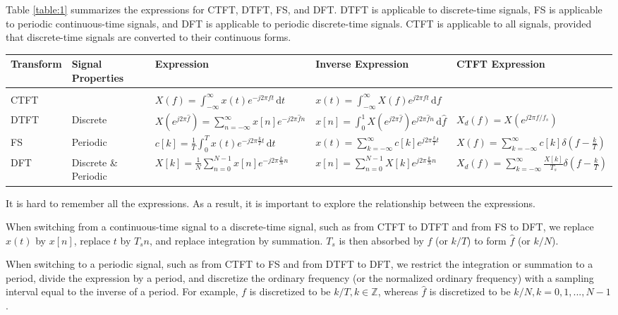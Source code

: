 \documentclass[journal,twoside]{IEEEtran}
\newcommand{\dd}{\,\mathrm{d}}
\begin{document}
Table \ref{table:1} summarizes the expressions for CTFT, DTFT, FS, and DFT. DTFT is applicable to discrete-time signals, FS is applicable to periodic continuous-time signals, and DFT is applicable to periodic discrete-time signals. CTFT is applicable to all signals, provided that discrete-time signals are converted to their continuous forms.

\begin{table*}[htb!]
\caption{Summary of CTFT, DTFT, FS, and DFT}
\centering
{\renewcommand{\arraystretch}{1.5}
\begin{tabular}{l|l|l|l|l}
\hline
Transform & Signal Properties & Expression & Inverse Expression & CTFT Expression \\
\hline
& & & & \\[-2.9ex] %
CTFT & & $\displaystyle  X(f)=\int_{-\infty}^{\infty}x(t)e^{-j 2\pi ft}\dd t $ & $\displaystyle x(t)=\int_{-\infty}^{\infty}X(f)e^{j 2\pi ft}\dd f$ & \\
DTFT & Discrete & $\displaystyle X(e^{j 2\pi\hat{f}}) = \sum_{n=-\infty}^{\infty}x[n]e^{-j 2\pi \hat{f} n}$ & $\displaystyle x[n] = \int_{0}^{1}X(e^{j 2\pi\hat{f}})e^{j 2\pi \hat{f} n}\dd \hat{f}$ & $\displaystyle X_d(f) = X(e^{j 2 \pi f/f_s})$ \\
FS & Periodic & $\displaystyle c[k] = \frac{1}{T}\int_{0}^{T}x(t)e^{-j2\pi\frac{k}{T}t}\dd t$ & $\displaystyle x(t) = \sum_{k=-\infty}^{\infty}c[k]e^{j2\pi\frac{k}{T}t}$ & $\displaystyle X(f) = \sum_{k=-\infty}^{\infty}c[k]\delta\left(f-\frac{k}{T}\right)$ \\
DFT & Discrete \& Periodic & $\displaystyle X[k] = \frac{1}{N}\sum_{n=0}^{N-1}x[n]e^{-j 2\pi \frac{k}{N} n}$ & $\displaystyle x[n] = \sum_{n=0}^{N-1}X[k]e^{j 2\pi \frac{k}{N} n}$ & $\displaystyle X_d(f) = \sum_{k=-\infty}^{\infty}\frac{X[k]}{T_s}\delta\left(f-\frac{k}{T}\right)$ \\
\hline
\end{tabular}}
\label{table:1}
\end{table*}

It is hard to remember all the expressions. As a result, it is important to explore the relationship between the expressions.

When switching from a continuous-time signal to a discrete-time signal, such as from CTFT to DTFT and from FS to DFT, we replace $x(t)$ by $x[n]$, replace $t$ by $T_s n$, and replace integration by summation. $T_s$ is then absorbed by $f$ (or $k/T$) to form $\hat{f}$ (or $k/N$).

When switching to a periodic signal, such as from CTFT to FS and from DTFT to DFT, we restrict the integration or summation to a period, divide the expression by a period, and discretize the ordinary frequency (or the normalized ordinary frequency) with a sampling interval equal to the inverse of a period. For example, $f$ is discretized to be $k/T, k\in\mathbb{Z}$, whereas $\hat{f}$ is discretized to be $k/N, k = 0,1,...,N-1$.
\end{document}

